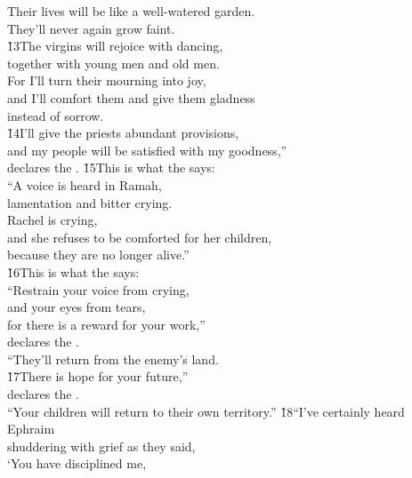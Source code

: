 \begin{poetry}
\poeml Their lives will be like a well-watered garden. \\
\poemll    They'll never again grow faint. \\
\poeml \v{13}The virgins will rejoice with dancing, \\
\poemll    together with young men and old men. \\
\poeml For I'll turn their mourning into joy, \\
\poemll    and I'll comfort them and give them gladness \\
\poemlll       instead of sorrow. \\
\poeml \v{14}I'll give the priests abundant provisions, \\
\poemll    and my people will be satisfied with my goodness,'' \\
\poemlll       declares the .
\poeml \v{15}This is what the  says: \\
\poeml ``A voice is heard in Ramah, \\
\poemll    lamentation and bitter crying. \\
\poeml Rachel is crying, \\
\poemll    and she refuses to be comforted for her children, \\
\poemlll       because they are no longer alive.'' \\
\poeml \v{16}This is what the  says: \\
\poeml ``Restrain your voice from crying, \\
\poemll    and your eyes from tears, \\
\poeml for there is a reward for your work,'' \\
\poemll    declares the . \\
\poemlll       ``They'll return from the enemy's land. \\
\poeml \v{17}There is hope for your future,'' \\
\poemll    declares the . \\
\poeml ``Your children will return to their own territory.''
\poeml \v{18}``I've certainly heard Ephraim \\
\poemll    shuddering with grief as they said, \\
\poeml `You have disciplined me, \\

\end{poetry}

